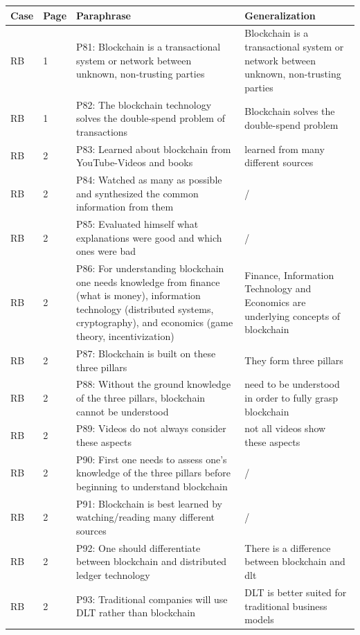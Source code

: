 \begin{table}[H]
    \centering
    \begin{tabularx}{\textwidth}{ll|X|p{4.5cm}}
	Case & Page & Paraphrase & Generalization \\ \hline
	RB & 1 & P81: Blockchain is a transactional system or network between unknown, non-trusting parties & Blockchain is a transactional system or network between unknown, non-trusting parties \\
	RB & 1 & P82: The blockchain technology solves the double-spend problem of transactions & Blockchain solves the double-spend problem \\ 
	RB & 2 & P83: Learned about blockchain from YouTube-Videos and books & learned from many different sources \\ 
	RB & 2 & P84: Watched as many as possible and synthesized the common information from them & /  \\
	RB & 2 & P85: Evaluated himself what explanations were good and which ones were bad & / \\ 
	RB & 2 & P86: For understanding blockchain one needs knowledge from finance (what is money), information technology (distributed systems, cryptography), and economics (game theory, incentivization) & Finance, Information Technology and Economics are underlying concepts of blockchain  \\  
	RB & 2 & P87: Blockchain is built on these three pillars & They form three pillars  \\  
	RB & 2 & P88: Without the ground knowledge of the three pillars, blockchain cannot be understood & need to be understood in order to fully grasp blockchain \\
	RB & 2 & P89: Videos do not always consider these aspects & not all videos show these aspects  \\
	RB & 2 & P90: First one needs to assess one's knowledge of the three pillars before beginning to understand blockchain & /  \\ 
	RB & 2 & P91: Blockchain is best learned by watching/reading many different sources & / \\
	RB & 2 & P92: One should differentiate between blockchain and distributed ledger technology & There is a difference between blockchain and dlt  \\
	RB & 2 & P93: Traditional companies will use DLT rather than blockchain & DLT is better suited for traditional business models   \\ 

\end{tabularx}
\end{table}
